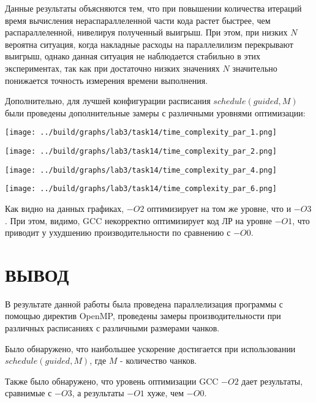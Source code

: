 \documentclass[14pt, a4paper, oneside, final]{extarticle}
\begin{document}
Данные результаты объясняются тем, что при повышении количества итераций время вычисления нераспараллеленной части кода растет быстрее, чем распараллеленной, нивелируя полученный выигрыш. При этом, при низких $N$ вероятна ситуация, когда накладные расходы на параллелилизм перекрывают выигрыш, однако данная ситуация не наблюдается стабильно в этих экспериментах, так как при достаточно низких значениях $N$ значительно понижается точность измерения времени выполнения.

Дополнительно, для лучшей конфигурации расписания $schedule(guided, M)$ были проведены дополнительные замеры с различными уровнями оптимизации:

\texttt{[image: ../build/graphs/lab3/task14/time\_complexity\_par\_1.png]}

\texttt{[image: ../build/graphs/lab3/task14/time\_complexity\_par\_2.png]}

\texttt{[image: ../build/graphs/lab3/task14/time\_complexity\_par\_4.png]}

\texttt{[image: ../build/graphs/lab3/task14/time\_complexity\_par\_6.png]}

Как видно на данных графиках, $-O2$ оптимизирует на том же уровне, что и $-O3$.
При этом, видимо, GCC некорректно оптимизирует код ЛР на уровне $-O1$, что приводит у ухудшению производительности по сравнению с $-O0$.

\clearpage
\section*{ВЫВОД}

В результате данной работы была проведена параллелизация программы с помощью директив OpenMP, проведены замеры производительности при различных расписаниях с различными размерами чанков.

Было обнаружено, что наибольшее ускорение достигается при использовании $schedule(guided, M)$, где $M$ - количество чанков.

Также было обнаружено, что уровень оптимизации GCC $-O2$ дает результаты, сравнимые с $-O3$, а результаты $-O1$ хуже, чем $-O0$.
\end{document}
